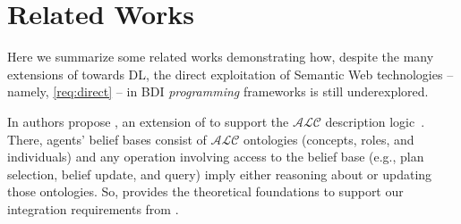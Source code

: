 \documentclass[
]{ceurart}
\begin{document}
\section{Related Works}
\label{sec:related-works}




Here we summarize some related works demonstrating how,
despite the many extensions of \agentspeak{} towards \ac{DL},
the direct exploitation of Semantic Web technologies
-- namely, \ref{req:direct} --
in \ac{BDI} \emph{programming} frameworks is still underexplored.


In \cite{DBLP:conf/dalt/MoreiraVBH05} authors propose \agentspeakdl{},
an extension of \agentspeak{} to support the $\mathcal{ALC}$ description logic~\cite{BAADER2008135}.
%
There,
agents' belief bases consist of $\mathcal{ALC}$ ontologies
(concepts, roles, and individuals)
and any operation involving access to the belief base
(e.g., plan selection, belief update, and query)
imply either reasoning about or updating those ontologies.
%
So,
\agentspeakdl{} provides the theoretical foundations to support our integration requirements from .
\end{document}
